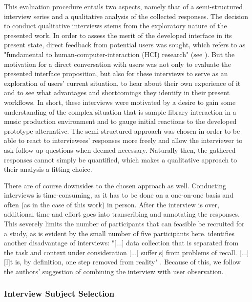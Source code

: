 This evaluation procedure entails two aspects, namely that of a semi-structured
interview series and a qualitative analysis of the collected responses. The
decision to conduct qualitative interviews stems from the exploratory nature of
the presented work. In order to assess the merit of the developed interface in
its present state, direct feedback from potential users was sought, which
\citet{lazar2017} refers to as "fundamental to human-computer-interaction (HCI)
research" (see \citet[p.187]{lazar2017}). But the motivation for a direct
conversation with users was not only to evaluate the presented interface
proposition, but also for these interviews to serve as an exploration of users'
current situation, to hear about their own experience of it and to see what
advantages and shortcomings they identify in their present workflows. In short,
these interviews were motivated by a desire to gain some understanding of the
complex situation that is sample library interaction in a music production
environment and to gauge initial reactions to the developed prototype
alternative. The semi-structured approach was chosen in order to be able to
react to interviewees' responses more freely and allow the interviewer to ask
follow up questions when deemed necessary. Naturally then, the gathered
responses cannot simply be quantified, which makes a qualitative approach to
their analysis a fitting choice.

\smallskip

There are of course downsides to the chosen approach as well. Conducting
interviews is time-consuming, as it has to be done on a one-on-one basis and
often (as in the case of this work) in person. After the interview is over,
additional time and effort goes into transcribing and annotating the responses.
This severely limits the number of participants that can feasible be recruited
for a study, as is evident by the small number of five participants here.
\citet{lazar2017} identifies another disadvantage of interviews: "[...] data
collection that is separated from the task and context under consideration [...]
suffer[s] from problems of recall. [...] [I]t is, by definition, one step
removed from reality" \citep[p.188ff.]{lazar2017}. Because of this, we follow
the authors' suggestion of combining the interview with user observation.

\bigskip


\subsubsection{Interview Subject Selection}
\label{subsubsec:subject_selection}

